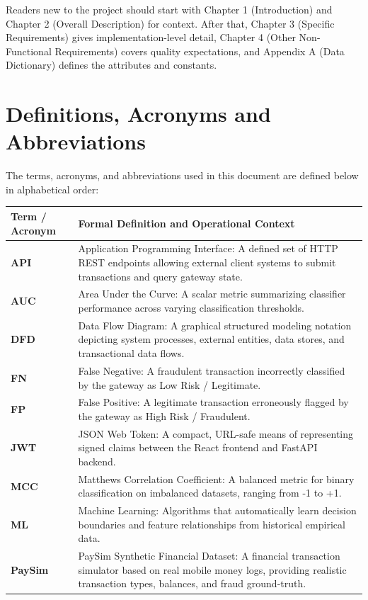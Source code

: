 \documentclass[12pt, a4paper]{report}
\begin{document}
Readers new to the project should start with Chapter 1 (Introduction) and Chapter 2 (Overall Description) for context. After that, Chapter 3 (Specific Requirements) gives implementation-level detail, Chapter 4 (Other Non-Functional Requirements) covers quality expectations, and Appendix A (Data Dictionary) defines the attributes and constants.

\section{Definitions, Acronyms and Abbreviations}
The terms, acronyms, and abbreviations used in this document are defined below in alphabetical order:

\begin{table}[h]
\centering
\small
\begin{tabularx}{\textwidth}{|l|X|}
\hline
\rowcolor{tableheadbg}
\textbf{{Term / Acronym}} & \textbf{{Formal Definition and Operational Context}} \\
\hline
\textbf{API} & Application Programming Interface: A defined set of HTTP REST endpoints allowing external client systems to submit transactions and query gateway state. \\
\hline
\textbf{AUC} & Area Under the Curve: A scalar metric summarizing classifier performance across varying classification thresholds. \\
\hline
\textbf{DFD} & Data Flow Diagram: A graphical structured modeling notation depicting system processes, external entities, data stores, and transactional data flows. \\
\hline
\textbf{FN} & False Negative: A fraudulent transaction incorrectly classified by the gateway as Low Risk / Legitimate. \\
\hline
\textbf{FP} & False Positive: A legitimate transaction erroneously flagged by the gateway as High Risk / Fraudulent. \\
\hline
\textbf{JWT} & JSON Web Token: A compact, URL-safe means of representing signed claims between the React frontend and FastAPI backend. \\
\hline
\textbf{MCC} & Matthews Correlation Coefficient: A balanced metric for binary classification on imbalanced datasets, ranging from -1 to +1. \\
\hline
\textbf{ML} & Machine Learning: Algorithms that automatically learn decision boundaries and feature relationships from historical empirical data. \\
\hline
\textbf{PaySim} & PaySim Synthetic Financial Dataset: A financial transaction simulator based on real mobile money logs, providing realistic transaction types, balances, and fraud ground-truth. \\

\end{tabularx}
\end{table}
\end{document}
